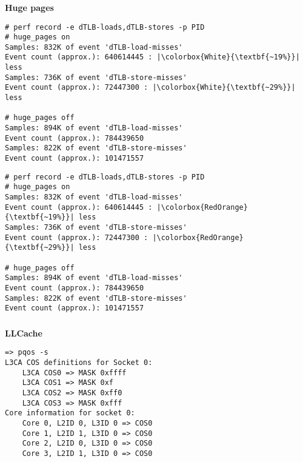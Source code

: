 \documentclass[usenames,dvipsnames, 18pt, compress, aspectratio=169]{beamer}
\begin{document}
\begin{frame}[fragile]{}
    \frametitle{}
    \begin{center}
        \textbf{Huge pages}

    \begin{overprint}
        \begin{flushleft}
        \begin{verbatim}
# perf record -e dTLB-loads,dTLB-stores -p PID
# huge_pages on
Samples: 832K of event 'dTLB-load-misses'
Event count (approx.): 640614445 : |\colorbox{White}{\textbf{~19%}}| less
Samples: 736K of event 'dTLB-store-misses'
Event count (approx.): 72447300 : |\colorbox{White}{\textbf{~29%}}| less

# huge_pages off
Samples: 894K of event 'dTLB-load-misses'
Event count (approx.): 784439650
Samples: 822K of event 'dTLB-store-misses'
Event count (approx.): 101471557
        \end{verbatim}
        \end{flushleft}

        \begin{flushleft}
        \begin{verbatim}
# perf record -e dTLB-loads,dTLB-stores -p PID
# huge_pages on
Samples: 832K of event 'dTLB-load-misses'
Event count (approx.): 640614445 : |\colorbox{RedOrange}{\textbf{~19%}}| less
Samples: 736K of event 'dTLB-store-misses'
Event count (approx.): 72447300 : |\colorbox{RedOrange}{\textbf{~29%}}| less

# huge_pages off
Samples: 894K of event 'dTLB-load-misses'
Event count (approx.): 784439650
Samples: 822K of event 'dTLB-store-misses'
Event count (approx.): 101471557
        \end{verbatim}
        \end{flushleft}

    \end{overprint}
    \end{center}
\end{frame}

\begin{frame}[fragile]{}
    \frametitle{}
    \begin{center}
        \textbf{LLCache}

        \begin{flushleft}
		\begin{verbatim}
=> pqos -s
L3CA COS definitions for Socket 0:
	L3CA COS0 => MASK 0xffff
	L3CA COS1 => MASK 0xf
	L3CA COS2 => MASK 0xff0
	L3CA COS3 => MASK 0xfff
Core information for socket 0:
	Core 0, L2ID 0, L3ID 0 => COS0
	Core 1, L2ID 1, L3ID 0 => COS0
	Core 2, L2ID 0, L3ID 0 => COS0
	Core 3, L2ID 1, L3ID 0 => COS0
        \end{verbatim}
        \end{flushleft}

    \end{center}
\end{frame}
\end{document}
